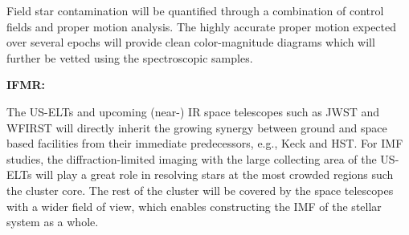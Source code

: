 \documentclass[11pt]{article}
\begin{document}
Field star contamination will be quantified through a combination of control fields and proper motion analysis. The highly accurate proper motion expected over several epochs will provide clean color-magnitude diagrams which will further be vetted using the spectroscopic samples. 


{\bf IFMR: }

%

\otherfacilities

The US-ELTs and upcoming (near-) IR space telescopes such as JWST and WFIRST will directly inherit the growing synergy between ground and space based facilities from their immediate predecessors, e.g., Keck and HST. For IMF studies, the diffraction-limited imaging with the large collecting area of the US-ELTs will play a great role in resolving stars at the most crowded regions such the cluster core. The rest of the cluster will be covered by the space telescopes with a wider field of view, which enables constructing the IMF of the stellar system as a whole.



\end{document}
